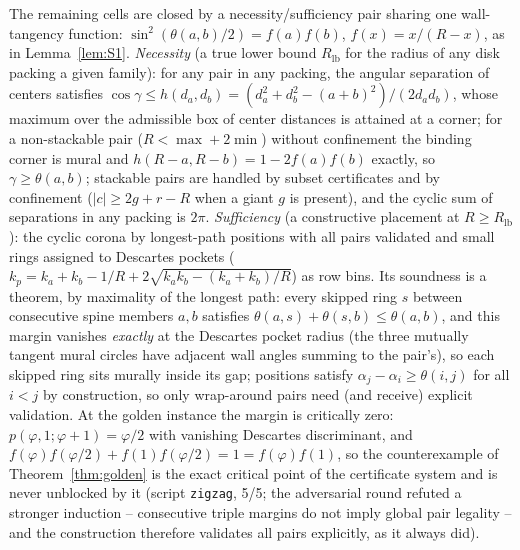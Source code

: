 \documentclass[11pt]{article}
\theoremstyle{definition}
\begin{document}
The remaining cells are closed
by a necessity/sufficiency pair sharing one wall-tangency function:
$\sin^2(\theta(a,b)/2)=f(a)f(b)$, $f(x)=x/(R-x)$, as in
Lemma~\ref{lem:S1}. \emph{Necessity} (a true lower bound $R_{\mathrm{lb}}$
for the radius of any disk packing a given family): for any pair in
any packing, the angular separation of centers satisfies
$\cos\gamma\le h(d_a,d_b)=(d_a^2+d_b^2-(a+b)^2)/(2d_ad_b)$, whose
maximum over the admissible box of center distances is attained at a
corner; for a non-stackable pair ($R<\max+2\min$) without confinement
the binding corner is mural and $h(R-a,R-b)=1-2f(a)f(b)$ exactly, so
$\gamma\ge\theta(a,b)$; stackable pairs are handled by subset
certificates and by confinement ($|c|\ge2g+r-R$ when a giant $g$ is
present), and the cyclic sum of separations in any packing is $2\pi$.
\emph{Sufficiency} (a constructive placement at $R\ge R_{\mathrm{lb}}$):
the cyclic corona by longest-path positions with all pairs validated
and small rings assigned to Descartes pockets
($k_p=k_a+k_b-1/R+2\sqrt{k_ak_b-(k_a+k_b)/R}$) as row bins. Its
soundness is a theorem, by maximality of the longest path: every
skipped ring $s$ between consecutive spine members $a,b$ satisfies
$\theta(a,s)+\theta(s,b)\le\theta(a,b)$, and this margin vanishes
\emph{exactly} at the Descartes pocket radius (the three mutually
tangent mural circles have adjacent wall angles summing to the
pair's), so each skipped ring sits murally inside its gap; positions
satisfy $\alpha_j-\alpha_i\ge\theta(i,j)$ for all $i<j$ by
construction, so only wrap-around pairs need (and receive) explicit
validation. At the golden instance the margin is critically zero:
$p(\varphi,1;\varphi+1)=\varphi/2$ with vanishing Descartes
discriminant, and
$f(\varphi)f(\varphi/2)+f(1)f(\varphi/2)=1=f(\varphi)f(1)$, so the
counterexample of Theorem~\ref{thm:golden} is the exact critical
point of the certificate system and is never unblocked by it
(script \texttt{zigzag}, 5/5; the adversarial round refuted a
stronger induction -- consecutive triple margins do not imply global
pair legality -- and the construction therefore validates all pairs
explicitly, as it always did).
\end{document}
